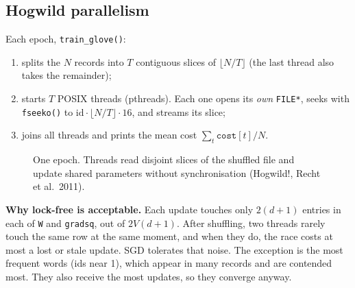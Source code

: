 \documentclass[11pt,a4paper]{article}
\newcommand{\fn}[1]{\texttt{#1()}}
\begin{document}
\subsection{Hogwild parallelism}
\label{sec:hogwild}

Each epoch, \fn{train\_glove}:
\begin{enumerate}[nosep]
  \item splits the $N$ records into $T$ contiguous slices of $\lfloor N/T\rfloor$ (the last
        thread also takes the remainder);
  \item starts $T$ POSIX threads (pthreads). Each one opens its \emph{own} \texttt{FILE*}, seeks with
        \fn{fseeko} to $\text{id}\cdot\lfloor N/T\rfloor\cdot16$, and streams its slice;
  \item joins all threads and prints the mean cost $\sum_t\texttt{cost}[t]/N$.
\end{enumerate}

\begin{figure}[h]
\centering
{}
\caption{One epoch. Threads read disjoint slices of the shuffled file and update shared
parameters without synchronisation (Hogwild!, Recht et al.\ 2011).}
\end{figure}

\textbf{Why lock-free is acceptable.} Each update touches only $2(d+1)$ entries in each of
\texttt{W} and \texttt{gradsq}, out of $2V(d+1)$. After shuffling, two threads rarely touch
the same row at the same moment, and when they do, the race costs at most a lost or stale
update. SGD tolerates that noise. The exception is the most frequent words (ids near 1),
which appear in many records and are contended most. They also receive the most updates,
so they converge anyway.
\end{document}

